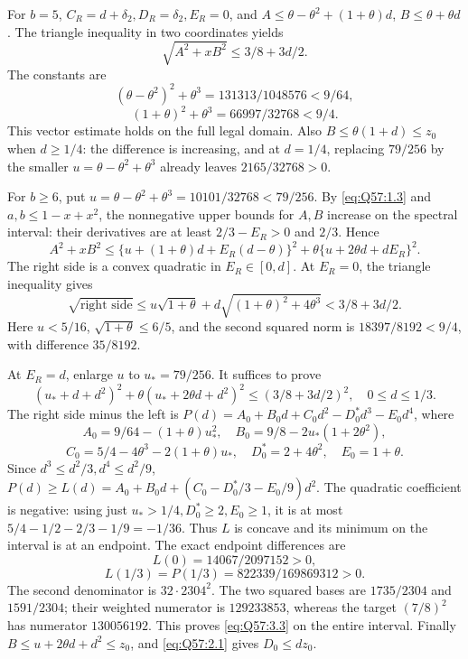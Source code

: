 For \(b=\allowbreak 5\), \(C_R=\allowbreak d+\delta_2,\allowbreak D_R=\allowbreak \delta_2,\allowbreak E_R=\allowbreak 0\), and
\(A\le\allowbreak \theta-\theta^2+(1+\theta)d\), \(B\le\allowbreak \theta+\theta d\).
The triangle inequality in two coordinates yields
\[
\sqrt{A^2+xB^2}\le3/8+3d/2.
\]
The constants are
\[
(\theta-\theta^2)^2+\theta^3
=131313/1048576<9/64,
\]
\[
(1+\theta)^2+\theta^3=66997/32768<9/4 .
\]
This vector estimate holds on the full legal domain. Also
\(B\le\allowbreak \theta(1+d)\le\allowbreak  z_0\) when \(d\ge\allowbreak 1/4\): the difference is increasing, and at \(d=\allowbreak 1/4\), replacing \(79/256\) by the smaller
\(u=\allowbreak \theta-\theta^2+\theta^3\) already leaves \(2165/32768>\allowbreak 0\).

For \(b\ge\allowbreak 6\), put \(u=\allowbreak \theta-\theta^2+\theta^3=\allowbreak 10101/32768<\allowbreak 79/256\).
By \eqref{eq:Q57:1.3} and \(a,\allowbreak b\le\allowbreak 1-x+x^2\), the nonnegative upper bounds for \(A,\allowbreak B\) increase on the spectral interval: their derivatives are at least \(2/3-E_R>\allowbreak 0\) and \(2/3\). Hence
\[
A^2+xB^2\le
\{u+(1+\theta)d+E_R(d-\theta)\}^2
 +\theta\{u+2\theta d+dE_R\}^2. \tag{Q57.3.2}\label{eq:Q57:3.2}
\]
The right side is a convex quadratic in \(E_R\in[0,\allowbreak d]\).
At \(E_R=\allowbreak 0\), the triangle inequality gives
\[
\sqrt{\text{right side}}
\le u\sqrt{1+\theta}
 +d\sqrt{(1+\theta)^2+4\theta^3}
<3/8+3d/2.
\]
Here \(u<\allowbreak 5/16\), \(\sqrt{1+\theta}\le\allowbreak 6/5\), and the second squared norm is
\(18397/8192<\allowbreak 9/4\), with difference \(35/8192\).

At \(E_R=\allowbreak d\), enlarge \(u\) to \(u_*=\allowbreak 79/256\). It suffices to prove
\[
(u_*+d+d^2)^2+\theta(u_*+2\theta d+d^2)^2
\le(3/8+3d/2)^2,\quad0\le d\le1/3 . \tag{Q57.3.3}\label{eq:Q57:3.3}
\]
The right side minus the left is
\(P(d)=\allowbreak A_0+B_0d+C_0d^2-D_0^*d^3-E_0d^4\), where
\[
A_0=9/64-(1+\theta)u_*^2,\quad
B_0=9/8-2u_*(1+2\theta^2),
\]
\[
C_0=5/4-4\theta^3-2(1+\theta)u_*,
\quad D_0^*=2+4\theta^2,\quad E_0=1+\theta.
\]
Since \(d^3\le\allowbreak  d^2/3,\allowbreak d^4\le\allowbreak  d^2/9\),
\(P(d)\ge\allowbreak  L(d)=\allowbreak A_0+B_0d+(C_0-D_0^*/3-E_0/9)d^2\).
The quadratic coefficient is negative: using just
\(u_*>\allowbreak 1/4,\allowbreak D_0^*\ge\allowbreak 2,\allowbreak E_0\ge\allowbreak 1\), it is at most
\(5/4-1/2-2/3-1/9=\allowbreak -1/36\).
Thus \(L\) is concave and its minimum on the interval is at an endpoint.
The exact endpoint differences are
\[
L(0)=14067/2097152>0,
\]
\[
L(1/3)=P(1/3)=822339/169869312>0 .
\]
The second denominator is \(32\cdot2304^2\). The two squared bases are
\(1735/2304\) and \(1591/2304\); their weighted numerator is \(129233853\), whereas the target \((7/8)^2\) has numerator \(130056192\).
This proves \eqref{eq:Q57:3.3} on the entire interval.
Finally \(B\le\allowbreak  u+2\theta d+d^2\le\allowbreak  z_0\), and
\eqref{eq:Q57:2.1} gives \(D_0\le\allowbreak  dz_0\).

